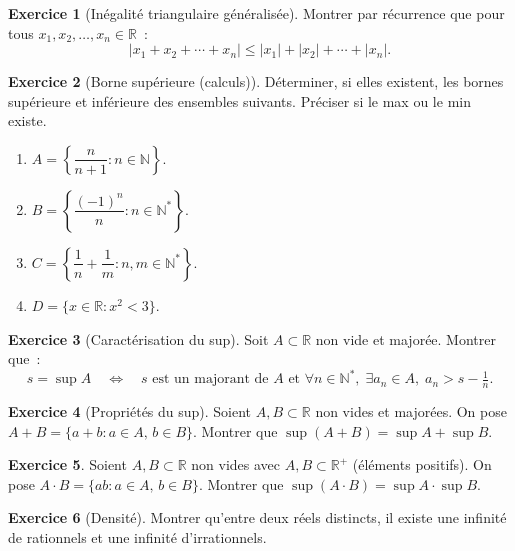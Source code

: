 \documentclass[12pt,a4paper,openany]{book}
\theoremstyle{definition}
\newtheorem{exercice}{Exercice}[chapter]
\newcommand{\N}{\mathbb{N}}
\newcommand{\R}{\mathbb{R}}
\newcommand{\abs}[1]{\left\lvert #1 \right\rvert}
\begin{document}
\begin{exercice}[Inégalité triangulaire généralisée]\label{exo:exo-ineg-triang}
  Montrer par récurrence que pour tous $x_1, x_2, \ldots, x_n \in \R$~:
  \[
    \abs{x_1 + x_2 + \cdots + x_n} \leq \abs{x_1} + \abs{x_2} + \cdots + \abs{x_n}.
  \]
\end{exercice}

\begin{exercice}[Borne supérieure (calculs)]\label{exo:exo-sup-calculs}
  Déterminer, si elles existent, les bornes supérieure et inférieure des ensembles suivants. Préciser si le max ou le min existe.
  \begin{enumerate}[label=(\alph*)]
    \item $A = \left\{\dfrac{n}{n+1} : n \in \N\right\}$.
    \item $B = \left\{\dfrac{(-1)^n}{n} : n \in \N^*\right\}$.
    \item $C = \left\{\dfrac{1}{n} + \dfrac{1}{m} : n, m \in \N^*\right\}$.
    \item $D = \{x \in \R : x^2 < 3\}$.
  \end{enumerate}
\end{exercice}

\begin{exercice}[Caractérisation du sup]\label{exo:exo-caract-sup}
  Soit $A \subset \R$ non vide et majorée. Montrer que~:
  \[
    s = \sup A \quad \Longleftrightarrow \quad
    s \text{ est un majorant de } A \text{ et } \forall n \in \N^*,\; \exists a_n \in A,\; a_n > s - \tfrac{1}{n}.
  \]
\end{exercice}

\begin{exercice}[Propriétés du sup]\label{exo:exo-prop-sup}
  Soient $A, B \subset \R$ non vides et majorées. On pose $A + B = \{a + b : a \in A,\, b \in B\}$.
  Montrer que $\sup(A + B) = \sup A + \sup B$.
\end{exercice}

\begin{exercice}\label{exo:exo-sup-produit}
  Soient $A, B \subset \R$ non vides avec $A, B \subset \R^+$ (éléments positifs). On pose $A \cdot B = \{ab : a \in A,\, b \in B\}$. Montrer que $\sup(A \cdot B) = \sup A \cdot \sup B$.
\end{exercice}

\begin{exercice}[Densité]\label{exo:exo-densite}
  Montrer qu'entre deux réels distincts, il existe une infinité de rationnels et une infinité d'irrationnels.
\end{exercice}
\end{document}
